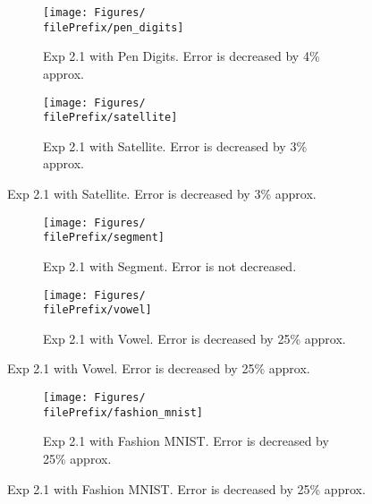 \begin{figure}[ht]
  \centering
  \begin{subfigure}[t]{0.5\linewidth}
    \centering\captionsetup{width=.8\linewidth}\texttt{[image: Figures/\\filePrefix/pen\_digits]}
    \caption{Exp 2.1 with Pen Digits. Error is decreased by 4\% approx.}
    \label{fig:\undPrefix_pen_digits}
  \end{subfigure}%
  \begin{subfigure}[t]{0.5\linewidth}
    \centering\captionsetup{width=.8\linewidth}\texttt{[image: Figures/\\filePrefix/satellite]}
    \caption{Exp 2.1 with Satellite. Error is decreased by 3\% approx.}
    \label{fig:\undPrefix_satellite}
  \end{subfigure}
\end{figure}

\begin{figure}[ht]
  \centering
  \begin{subfigure}[t]{0.5\linewidth}
    \centering\captionsetup{width=.8\linewidth}\texttt{[image: Figures/\\filePrefix/segment]}
    \caption{Exp 2.1 with Segment. Error is not decreased.}
    \label{fig:\undPrefix_segment}
  \end{subfigure}%
  \begin{subfigure}[t]{0.5\linewidth}
    \centering\captionsetup{width=.8\linewidth}\texttt{[image: Figures/\\filePrefix/vowel]}
    \caption{Exp 2.1 with Vowel. Error is decreased by 25\% approx.}
    \label{fig:\undPrefix_vowel}
  \end{subfigure}
\end{figure}


\begin{figure}[ht]
  \centering
  \begin{subfigure}[t]{0.5\linewidth}
    \centering\captionsetup{width=.8\linewidth}
    \texttt{[image: Figures/\\filePrefix/fashion\_mnist]}
    \caption{Exp 2.1 with Fashion MNIST. Error is decreased by 25\% approx.}
    \label{fig:\undPrefix_fashion_mnist}
  \end{subfigure}%
\end{figure}


\let\major\undefined
\let\minor\undefined

\let\undPrefix\undefined
\let\dotPrefix\undefined
\let\scoPrefix\undefined

\let\filePrefix\undefined

